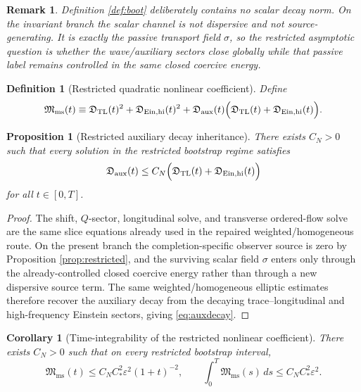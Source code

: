 \documentclass[11pt]{article}
\newtheorem{definition}{Definition}
\newtheorem{proposition}{Proposition}
\newtheorem{remark}{Remark}
\newtheorem{corollary}{Corollary}
\begin{document}
\begin{remark}
Definition \ref{def:boot} deliberately contains no scalar decay norm. On the invariant branch the scalar channel is not dispersive and not source-generating. It is exactly the passive transport field \(\sigma\), so the restricted asymptotic question is whether the wave/auxiliary sectors close globally while that passive label remains controlled in the same closed coercive energy.
\end{remark}

\begin{definition}[Restricted quadratic nonlinear coefficient]
\label{def:Mms}
Define
\begin{equation}
\mathfrak M_{\mathrm{ms}}(t)
\equiv
\mathfrak D_{\mathrm{TL}}(t)^2
+ \mathfrak D_{\mathrm{Ein,hi}}(t)^2
+ \mathfrak D_{\mathrm{aux}}(t)\Bigl(
\mathfrak D_{\mathrm{TL}}(t)+\mathfrak D_{\mathrm{Ein,hi}}(t)
\Bigr).
\label{eq:Mms}
\end{equation}
\end{definition}

\begin{proposition}[Restricted auxiliary decay inheritance]
\label{prop:aux}
There exists \(C_N>0\) such that every solution in the restricted bootstrap regime satisfies
\begin{equation}
\mathfrak D_{\mathrm{aux}}(t)
\le
C_N\Bigl(
\mathfrak D_{\mathrm{TL}}(t)+\mathfrak D_{\mathrm{Ein,hi}}(t)
\Bigr)
\label{eq:auxdecay}
\end{equation}
for all \(t\in[0,T]\).
\end{proposition}

\begin{proof}
The shift, \(Q\)-sector, longitudinal solve, and transverse ordered-flow solve are the same slice equations already used in the repaired weighted/homogeneous route. On the present branch the completion-specific observer source is zero by Proposition \ref{prop:restricted}, and the surviving scalar field \(\sigma\) enters only through the already-controlled closed coercive energy rather than through a new dispersive source term. The same weighted/homogeneous elliptic estimates therefore recover the auxiliary decay from the decaying trace--longitudinal and high-frequency Einstein sectors, giving \eqref{eq:auxdecay}.
\end{proof}

\begin{corollary}[Time-integrability of the restricted nonlinear coefficient]
\label{cor:Mint}
There exists \(C_N>0\) such that on every restricted bootstrap interval,
\begin{equation}
\mathfrak M_{\mathrm{ms}}(t)
\le
C_NC_\ast^2\varepsilon^2(1+t)^{-2},
\qquad
\int_0^T \mathfrak M_{\mathrm{ms}}(s)\,ds
\le
C_NC_\ast^2\varepsilon^2.
\label{eq:Mint}
\end{equation}
\end{corollary}
\end{document}

